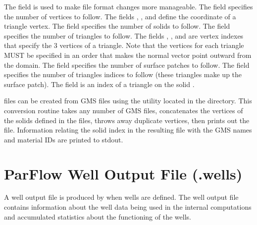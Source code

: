 \noindent
The field  is used to make file format changes
more manageable.
The field  specifies the number of vertices to follow.
The fields , , and  define the coordinate
of a triangle vertex.
The field  specifies the number of solids to follow.
The field  specifies the number of triangles to follow.
The fields , , and  are vertex indexes
that specify the 3 vertices of a triangle.  Note that the vertices for each
triangle MUST be specified in an order that makes the normal vector point
outward from the domain.
The field  specifies the number of surface patches
to follow.
The field  specifies the number of triangles
indices to follow (these triangles make up the surface patch).
The field  is an index of a triangle on the solid .

\parflow{}  files can be created from GMS 
files using the utility  located in the
 directory.
This conversion routine takes any number of GMS  files,
concatenates the vertices of the solids defined in the files, throws
away duplicate vertices, then prints out the  file.
Information relating the solid index in the resulting 
file with the GMS names and material IDs are printed to stdout.


\section{ParFlow Well Output File (.wells)}
\label{ParFlow Well Output File (.wells)}

A well output file is produced by \parflow{} when wells are defined.
The well output file contains information about the well data being
used in the internal computations and accumulated statistics about
the functioning of the wells.

